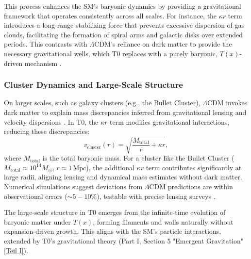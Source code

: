 \documentclass[12pt,a4paper]{article}
\newcommand{\Tfield}{T(x)}
\begin{document}
	This process enhances the SM’s baryonic dynamics by providing a gravitational framework that operates consistently across all scales. For instance, the \(\kappa r\) term introduces a long-range stabilizing force that prevents excessive dispersion of gas clouds, facilitating the formation of spiral arms and galactic disks over extended periods. This contrasts with \(\Lambda\)CDM’s reliance on dark matter to provide the necessary gravitational wells, which T0 replaces with a purely baryonic, \(\Tfield\)-driven mechanism \cite{pascher_galaxies_2025}.
	
	\subsubsection{Cluster Dynamics and Large-Scale Structure}
	On larger scales, such as galaxy clusters (e.g., the Bullet Cluster), \(\Lambda\)CDM invokes dark matter to explain mass discrepancies inferred from gravitational lensing and velocity dispersions \cite{McGaugh2016}. In T0, the \(\kappa r\) term modifies gravitational interactions, reducing these discrepancies:
	\begin{equation}
		v_{\text{cluster}}(r) = \sqrt{\frac{M_{\text{total}}}{r} + \kappa r},
		\label{eq:cluster_velocity}
	\end{equation}
	where \(M_{\text{total}}\) is the total baryonic mass. For a cluster like the Bullet Cluster (\(M_{\text{total}} \approx 10^{14} M_{\odot}\), \(r \approx 1 \, \text{Mpc}\)), the additional \(\kappa r\) term contributes significantly at large radii, aligning lensing and dynamical mass estimates without dark matter. Numerical simulations suggest deviations from \(\Lambda\)CDM predictions are within observational errors (\(\sim 5-10\%\)), testable with precise lensing surveys \cite{pascher_emergente_2025}.
	
	The large-scale structure in T0 emerges from the infinite-time evolution of baryonic matter under \(\Tfield\), forming filaments and walls naturally without expansion-driven growth. This aligns with the SM’s particle interactions, extended by T0’s gravitational theory (Part I, Section 5 "Emergent Gravitation" \href{https://github.com/jpascher/T0-Time-Mass-Duality/tree/main/2/pdf/English/QMRelTimeMassPart1En.pdf}{[Teil I]}).
	
\end{document}
